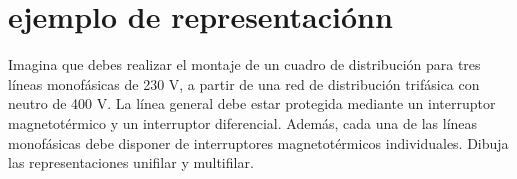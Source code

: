 \documentclass[spanish,openany]{report}
\date{\today}
\begin{document}

%
%
%




\section*{ejemplo de representaciónn}
Imagina que debes realizar el montaje de un cuadro de distribución para tres líneas monofásicas de 230 V, a partir de una red de 
distribución trifásica con neutro de 400 V. La línea general debe estar protegida mediante un interruptor magnetotérmico y un
interruptor diferencial. Además, cada una de las líneas monofásicas debe disponer de interruptores magnetotérmicos individuales. 
Dibuja las representaciones unifilar y multifilar.
\end{document}
